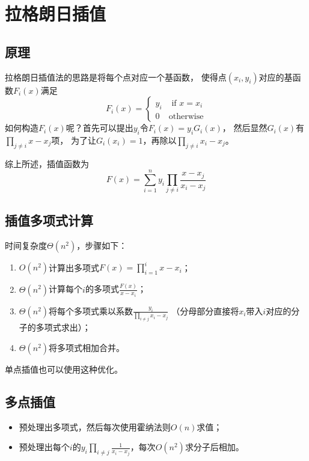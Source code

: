 \section{拉格朗日插值}
\subsection{原理}
拉格朗日插值法的思路是将每个点对应一个基函数，
使得点$(x_i,y_i)$对应的基函数$F_i(x)$满足
\begin{displaymath}
F_i(x)=\left\{\begin{array}{ll}
    y_i& \textrm{~if~$x=x_i$}\\
    0&\textrm{otherwise}
\end{array}\right.
\end{displaymath}
如何构造$F_i(x)$呢？首先可以提出$y_i$令$F_i(x)=y_iG_i(x)$，
然后显然$G_i(x)$有$\displaystyle \prod_{j\neq i}{x-x_j}$项，
为了让$G_i(x_i)=1$，再除以$\displaystyle \prod_{j\neq i}{x_i-x_j}$。

综上所述，插值函数为
\begin{displaymath}
    F(x)=\sum_{i=1}^n{y_i\prod_{j\neq i}{\frac{x-x_j}{x_i-x_j}}}
\end{displaymath}
\subsection{插值多项式计算}
时间复杂度$\Theta(n^2)$，步骤如下：
\begin{enumerate}
    \item $O(n^2)$计算出多项式$\displaystyle F(x)=\prod_{i=1}^i{x-x_i}$；
    \item $\Theta(n^2)$计算每个$i$的多项式$\frac{F(x)}{x-x_i}$；
    \item $\Theta(n^2)$将每个多项式乘以系数$\frac{y_i}{\prod_{i\neq j}{x_i-x_j}}$
    （分母部分直接将$x_i$带入$i$对应的分子的多项式求出）；
    \item $\Theta(n^2)$将多项式相加合并。
\end{enumerate}
单点插值也可以使用这种优化。
\subsection{多点插值}
\begin{itemize}
    \item 预处理出多项式，然后每次使用霍纳法则$O(n)$求值；
    \item 预处理出每个$i$的$\displaystyle y_i
    \prod_{i\neq j}\frac{1}{x_i-x_j}$，每次$O(n^2)$求分子后相加。
\end{itemize}

